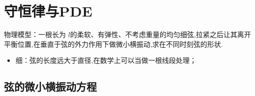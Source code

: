 \documentclass[../../PDE.tex]{subfiles}
\begin{document}
\section{守恒律与PDE}

物理模型：一根长为 \(  l  \)的柔软、有弹性、不考虑重量的均匀细弦,拉紧之后让其离开平衡位置,在垂直于弦的外力作用下做微小横振动,求在不同时刻弦的形状.

\begin{itemize}
    \item 细：弦的长度远大于直径,在数学上可以当做一根线段处理；
\end{itemize}


\subsection{弦的微小横振动方程}
\end{document}
